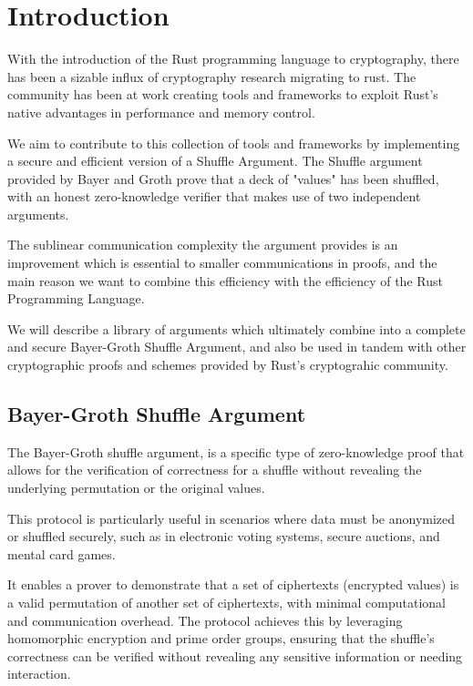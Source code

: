 \documentclass[12pt,a4paper]{report}
\begin{document}

\newpage
{}

\chapter{Introduction}
With the introduction of the Rust programming language to cryptography, there has been a sizable influx of cryptography research migrating to rust. 
The community has been at work creating tools and frameworks to exploit Rust's native advantages in performance and memory control. \par
We aim to contribute to this collection of tools and frameworks by implementing a secure and efficient version of a Shuffle Argument.
The Shuffle argument provided by Bayer and Groth \cite{bgshuffle} prove that a deck of "values" has been shuffled, with an honest zero-knowledge verifier that makes use of two independent arguments.\par
The sublinear communication complexity the argument provides is an improvement which is essential to smaller communications in proofs, and the main reason we want to combine this efficiency with the efficiency of the Rust Programming Language.\par
We will describe a library of arguments which ultimately combine into a complete and secure Bayer-Groth Shuffle Argument, 
and also be used in tandem with other cryptographic proofs and schemes provided by Rust's cryptograhic community.
\section{Bayer-Groth Shuffle Argument}
The Bayer-Groth shuffle argument\cite{bgshuffle}, is a specific type of zero-knowledge proof that
allows for the verification of correctness for a shuffle without revealing 
the underlying permutation or the original values. \par
This protocol is particularly useful in scenarios where data must be anonymized or shuffled 
securely, such as in electronic voting systems, secure auctions, and mental card games. \par
It enables a prover to demonstrate that a set of ciphertexts (encrypted values) is a valid 
permutation of another set of ciphertexts, with minimal computational and communication overhead.
The protocol achieves this by leveraging homomorphic encryption and prime order groups, ensuring that the shuffle's correctness can be verified without revealing any sensitive information or needing interaction.
\end{document}
